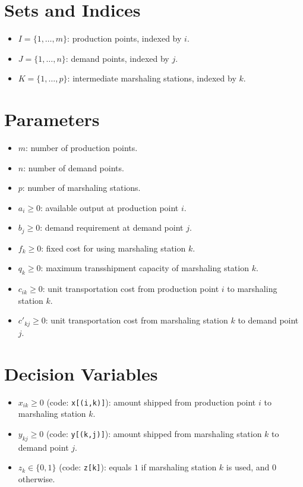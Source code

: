 \section*{Sets and Indices}

\begin{itemize}
    \item $I = \{1,\dots,m\}$: production points, indexed by $i$.
    \item $J = \{1,\dots,n\}$: demand points, indexed by $j$.
    \item $K = \{1,\dots,p\}$: intermediate marshaling stations, indexed by $k$.
\end{itemize}

\section*{Parameters}

\begin{itemize}
    \item $m$: number of production points.
    \item $n$: number of demand points.
    \item $p$: number of marshaling stations.
    \item $a_i \ge 0$: available output at production point $i$.
    \item $b_j \ge 0$: demand requirement at demand point $j$.
    \item $f_k \ge 0$: fixed cost for using marshaling station $k$.
    \item $q_k \ge 0$: maximum transshipment capacity of marshaling station $k$.
    \item $c_{ik} \ge 0$: unit transportation cost from production point $i$ to marshaling station $k$.
    \item $c'_{kj} \ge 0$: unit transportation cost from marshaling station $k$ to demand point $j$.
\end{itemize}

\section*{Decision Variables}

\begin{itemize}
    \item $x_{ik} \ge 0$ (code: \texttt{x[(i,k)]}): amount shipped from production point $i$ to marshaling station $k$.
    \item $y_{kj} \ge 0$ (code: \texttt{y[(k,j)]}): amount shipped from marshaling station $k$ to demand point $j$.
    \item $z_k \in \{0,1\}$ (code: \texttt{z[k]}): equals $1$ if marshaling station $k$ is used, and $0$ otherwise.
\end{itemize}

